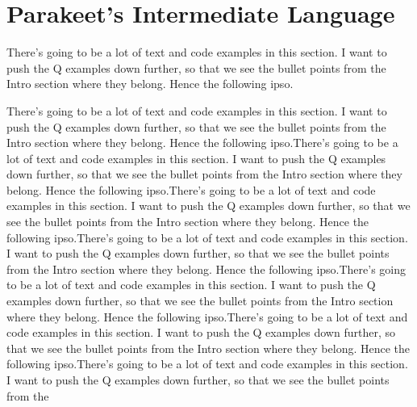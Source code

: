 \documentclass[preprint]{sigplanconf}
\begin{document}
\section{Parakeet's Intermediate Language}

There's going to be a lot of text and code examples in this section.  I want to
push the Q examples down further, so that we see the bullet points from the
Intro section where they belong.  Hence the following ipso.

There's going to be a lot of text and code examples in this section.  I want to
push the Q examples down further, so that we see the bullet points from the
Intro section where they belong.  Hence the following ipso.There's going to be a
lot of text and code examples in this section.  I want to
push the Q examples down further, so that we see the bullet points from the
Intro section where they belong.  Hence the following ipso.There's going to be a
lot of text and code examples in this section.  I want to
push the Q examples down further, so that we see the bullet points from the
Intro section where they belong.  Hence the following ipso.There's going to be a
lot of text and code examples in this section.  I want to
push the Q examples down further, so that we see the bullet points from the
Intro section where they belong.  Hence the following ipso.There's going to be a
lot of text and code examples in this section.  I want to
push the Q examples down further, so that we see the bullet points from the
Intro section where they belong.  Hence the following ipso.There's going to be a
lot of text and code examples in this section.  I want to
push the Q examples down further, so that we see the bullet points from the
Intro section where they belong.  Hence the following ipso.There's going to be a
lot of text and code examples in this section.  I want to
push the Q examples down further, so that we see the bullet points from the
\end{document}
